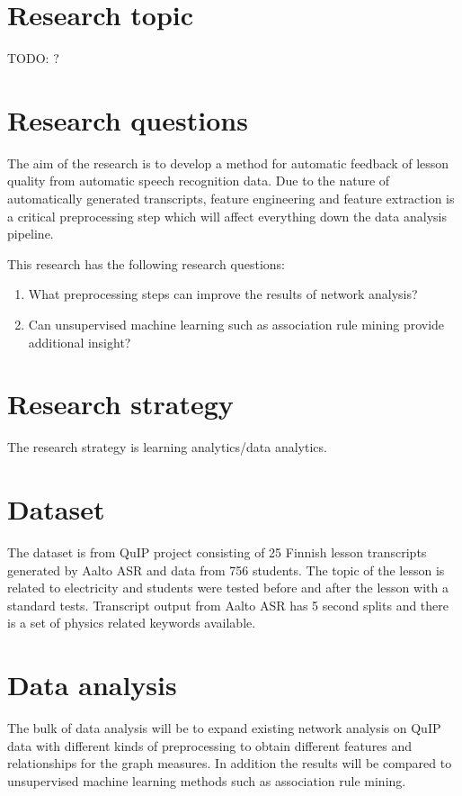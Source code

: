 \documentclass[utf8,english]{gradu3}
\begin{document}
\chapter{Research topic}

TODO: ?

\chapter{Research questions}
The aim of the research is to develop a method for automatic feedback of lesson quality from automatic speech recognition data. Due to the nature of automatically generated transcripts, feature engineering and feature extraction is a critical preprocessing step which will affect everything down the data analysis pipeline.

This research has the following research questions:


\begin{enumerate}
  \item What preprocessing steps can improve the results of network analysis?
  \item Can unsupervised machine learning such as association rule mining provide additional insight?
\end{enumerate}

\chapter{Research strategy}
The research strategy is learning analytics/data analytics.

\chapter{Dataset}

The dataset is from QuIP project \parencite{fischer2014quality} consisting of 25 Finnish lesson transcripts generated by Aalto ASR \parencite{hirsimaki2009importance,Mansikkaniemi2017} and data from 756 students. The topic of the lesson is related to electricity and students were tested before and after the lesson with a standard tests. Transcript output from Aalto ASR has 5 second splits and there is a set of physics related keywords available.


\chapter{Data analysis}

The bulk of data analysis will be to expand existing network analysis on QuIP data with different kinds of preprocessing to obtain different features and relationships for the graph measures. In addition the results will be compared to unsupervised machine learning methods such as association rule mining.
\end{document}
